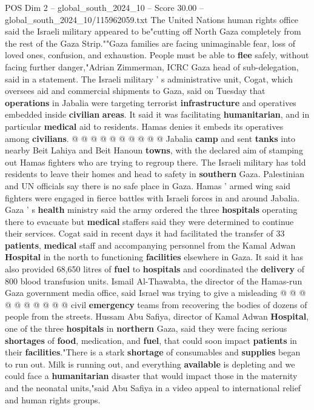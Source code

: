 \begin{textsample}{POS Dim 2 – global\_south\_2024\_10 – Score 30.00 – global\_south\_2024\_10/115962059.txt}
The United Nations human rights office said the Israeli military appeared to be"cutting off North Gaza completely from the rest of the Gaza Strip.""Gaza families are facing unimaginable fear, loss of loved ones, confusion, and exhaustion.
People must be able to \textbf{flee} safely, without facing further danger,"Adrian Zimmerman, ICRC Gaza head of sub-delegation, said in a statement.
The Israeli military ' s administrative unit, Cogat, which oversees aid and commercial shipments to Gaza, said on Tuesday that \textbf{operations} in Jabalia were targeting terrorist \textbf{infrastructure} and operatives embedded inside \textbf{civilian} \textbf{areas}.
It said it was facilitating \textbf{humanitarian}, and in particular \textbf{medical} aid to residents.
Hamas denies it embeds its operatives among \textbf{civilians}. @ @ @ @ @ @ @ @ @ @ Jabalia \textbf{camp} and sent \textbf{tanks} into nearby Beit Lahiya and Beit Hanoun \textbf{towns}, with the declared aim of stamping out Hamas fighters who are trying to regroup there.
The Israeli military has told residents to leave their homes and head to safety in \textbf{southern} Gaza.
Palestinian and UN officials say there is no safe place in Gaza.
Hamas ' armed wing said fighters were engaged in fierce battles with Israeli forces in and around Jabalia.
Gaza ' s \textbf{health} ministry said the army ordered the three \textbf{hospitals} operating there to evacuate but \textbf{medical} staffers said they were determined to continue their services.
Cogat said in recent days it had facilitated the transfer of 33 \textbf{patients}, \textbf{medical} staff and accompanying personnel from the Kamal Adwan \textbf{Hospital} in the north to functioning \textbf{facilities} elsewhere in Gaza.
It said it has also provided 68,650 litres of \textbf{fuel} to \textbf{hospitals} and coordinated the \textbf{delivery} of 800 blood transfusion units.
Ismail Al-Thawabta, the director of the Hamas-run Gaza government media office, said Israel was trying to give a misleading @ @ @ @ @ @ @ @ @ @ civil \textbf{emergency} teams from recovering the bodies of dozens of people from the streets.
Hussam Abu Safiya, director of Kamal Adwan \textbf{Hospital}, one of the three \textbf{hospitals} in \textbf{northern} Gaza, said they were facing serious \textbf{shortages} of \textbf{food}, medication, and \textbf{fuel}, that could soon impact \textbf{patients} in their \textbf{facilities}."There is a stark \textbf{shortage} of consumables and \textbf{supplies} began to run out.
Milk is running out, and everything \textbf{available} is depleting and we could face a \textbf{humanitarian} disaster that would impact those in the maternity and the neonatal units,"said Abu Safiya in a video appeal to international relief and human rights groups.

\end{textsample}
